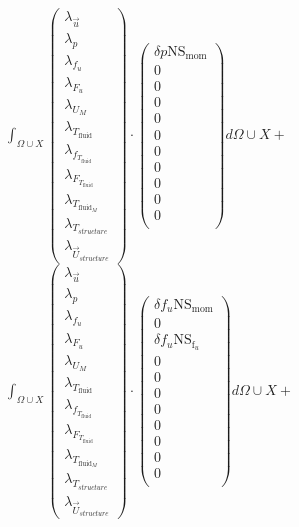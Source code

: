 \documentclass[10pt]{article} %
\begin{document}
\begin{center}
	$\int_{\Omega \cup X}
	\begin{pmatrix}
		\lambda_{\vec{u}} \\ \lambda_p \\ \lambda_{f_u} \\ \lambda_{F_u} \\ \lambda_{U_M}\\ \lambda_{T_{\text{fluid}}} \\ \lambda_{f_{T_{\text{fluid}}}} \\ \lambda_{F_{T_{\text{fluid}}}} \\ \lambda_{T_{\text{fluid}_M}} \\ \lambda_{T_{structure}} \\ \lambda_{\vec{U}_{structure}}
	\end{pmatrix}
	\cdot
	\begin{pmatrix}
		\delta p \text{NS}_{\text{mom}} \\
		0\\
		0 \\
		0 \\
		0 \\
		0 \\
		0\\
		0\\
		0\\
		0\\
		0\\
	\end{pmatrix}
	d\Omega \cup X + $\\

	$\int_{\Omega \cup X}
	\begin{pmatrix}
		\lambda_{\vec{u}} \\ \lambda_p \\ \lambda_{f_u} \\ \lambda_{F_u} \\ \lambda_{U_M}\\ \lambda_{T_{\text{fluid}}} \\ \lambda_{f_{T_{\text{fluid}}}} \\ \lambda_{F_{T_{\text{fluid}}}} \\ \lambda_{T_{\text{fluid}_M}} \\ \lambda_{T_{structure}} \\ \lambda_{\vec{U}_{structure}}
	\end{pmatrix}
	\cdot
	\begin{pmatrix}
		\delta f_u \text{NS}_{\text{mom}} \\
		0\\
		\delta f_u \text{NS}_{\text{f}_u} \\
		0 \\
		0 \\
		0 \\
		0\\
		0\\
		0\\
		0\\
		0\\
	\end{pmatrix}
	d\Omega \cup X + $\\


\end{center}
\end{document}
